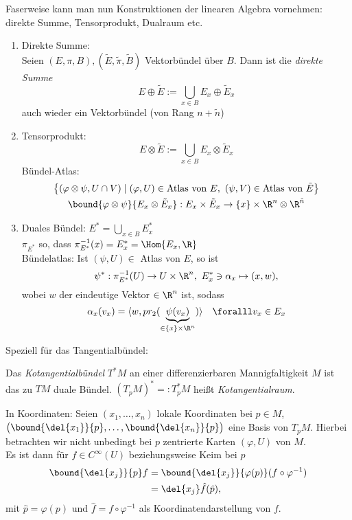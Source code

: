 \lecture Faserweise kann man nun Konstruktionen der linearen Algebra vornehmen: direkte Summe, Tensorprodukt, Dualraum etc.

\begin{exmp}\label{3.18}
	\begin{enumerate}[label={\roman*})]
		\item Direkte Summe:\\
			Seien $ (E,\pi,B),(\tilde{E},\tilde{\pi},\tilde{B}) $ Vektorbündel über $B$. Dann ist die \emph{direkte Summe}
			\[ E \oplus \tilde{E} := \bigcup_{x \in B} E_x \oplus \tilde{E}_x \]
			auch wieder ein Vektorbündel (von Rang $n + \tilde{n}$)
		\item Tensorprodukt:
			\[ E \otimes \tilde{E} := \bigcup_{x \in B} E_x \otimes \tilde{E}_x \]
		Bündel-Atlas:
			\begin{gather*}
				\big\{ (\varphi \otimes \psi, U \cap V) \mid (\varphi,U) \in \text{Atlas von }E,\ (\psi,V) \in \text{Atlas von } \tilde{E} \big\}\\
				\bound{\varphi \otimes \psi}{E_x \otimes \tilde{E}_x} : E_x \times \tilde{E}_x \to \{x\} \times \R^n \otimes \R^{\tilde{n}}
			\end{gather*}
		\item Duales Bündel: $ E^* = \bigcup_{x \in B} E_x^* $\\
			$ \pi_{E^*} $ so, dass $ \pi_{E^*}^{-1} (x) = E_x^* = \Hom{E_x,\R} $\\
			Bündelatlas: Ist $ (\psi,U) \in $ Atlas von $E$, so ist 
			$$ \psi^*: \pi_{E^*}^{-1} (U) \to U \times \R^n,\ E_x^* \ni \alpha_x \mapsto (x,w),$$
				wobei $w$ der eindeutige Vektor $\in \R^n$ ist, sodass
			\[ \alpha_x (v_x) = \langle w,pr_2(\underbrace{\psi(v_x)}_{\in \{x\} \times \R^n}) \rangle \quad \foralll v_x  \in E_x \]
	\end{enumerate}
\end{exmp}

Speziell für das Tangentialbündel:

\begin{defn}[Kotangentialbündel]
	Das \emph{Kotangentialbündel} $T^*M$ an einer differenzierbaren Mannigfaltigkeit $M$ ist das zu $TM$ duale Bündel. $ (T_pM)^* =: T_p^*M $ heißt \emph{Kotangentialraum}.
\end{defn}

In Koordinaten: Seien $ (x_1,\dotsc,x_n) $ lokale Koordinaten bei $p \in M$, $ \big( \bound{\del{x_1}}{p},\dotsc, \bound{\del{x_n}}{p} \big) $ eine Basis von $T_pM$. Hierbei betrachten wir nicht unbedingt bei $p$ zentrierte Karten $ (\varphi,U) $ von $M$.\\
Es ist dann für $f \in C^\infty(U)$ beziehungsweise Keim bei $p$
\begin{align*}
	\bound{\del{x_j}}{p}f &= \bound{\del{x_j}}{\varphi(p)} (f \circ \varphi^{-1})\\
	&= \del{x_j} \hat{f} (\hat{p}),
\end{align*}
mit $\hat{p} = \varphi(p)$ und $\hat{f} = f \circ \varphi^{-1}$ als Koordinatendarstellung von $f$.

